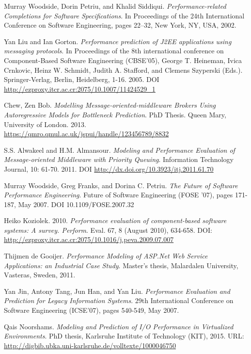 \documentclass[conference]{IEEEtran}
\begin{document}
\begin{thebibliography}{00}
 Murray Woodside, Dorin Petriu, and Khalid Siddiqui. \emph{Performance-related Completions for Software Specifications}. In Proceedings of the 24th International Conference on Software Engineering, pages 22–32, New York, NY, USA, 2002.

 Yan Liu and Ian Gorton. \emph{Performance prediction of J2EE applications using messaging protocols}. In Proceedings of the 8th international conference on Component-Based Software Engineering (CBSE'05), George T. Heineman, Ivica Crnkovic, Heinz W. Schmidt, Judith A. Stafford, and Clemens Szyperski (Eds.). Springer-Verlag, Berlin, Heidelberg, 1-16. 2005. DOI \url{http://ezproxy.itcr.ac.cr:2075/10.1007/11424529_1}

 Chew, Zen Bob. \emph{Modelling Message-oriented-middleware Brokers Using Autoregressive Models for Bottleneck Prediction}. PhD Thesis. Queen Mary, University of London. 2013. \url{https://qmro.qmul.ac.uk/jspui/handle/123456789/8832}

 S.S. Alwakeel and H.M. Almansour. \emph{Modeling and Performance Evaluation of Message-oriented Middleware with Priority Queuing}. Information Technology Journal, 10: 61-70. 2011. DOI \url{http://dx.doi.org/10.3923/itj.2011.61.70}

 Murray Woodside, Greg Franks, and Dorina C. Petriu. \emph{The Future of Software Performance Engineering}. Future of Software Engineering (FOSE '07), pages 171-187, May 2007. DOI 10.1109/FOSE.2007.32
 
 Heiko Koziolek. 2010. \emph{Performance evaluation of component-based software systems: A survey. Perform}. Eval. 67, 8 (August 2010), 634-658. DOI: \url{http://ezproxy.itcr.ac.cr:2075/10.1016/j.peva.2009.07.007}     

 Thijmen de Gooijer. \emph{Performance Modeling of ASP.Net Web
Service Applications: an Industrial Case Study}. Master's thesis, Malardalen University, Vasteras, Sweden, 2011.

 Yan Jin, Antony Tang, Jun Han, and Yan Liu. \emph{Performance Evaluation and Prediction for Legacy Information Systems}. 29th International Conference on Software Engineering (ICSE'07), pages 540-549, May 2007.

 Qais Noorshams. \emph{Modeling and Prediction of I/O Performance in Virtualized Environments}. PhD thesis, Karlsruhe Institute of Technology (KIT), 2015. URL: \url{http://digbib.ubka.uni-karlsruhe.de/volltexte/1000046750}


\end{thebibliography}
\end{document}
